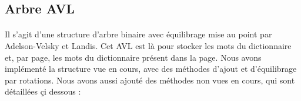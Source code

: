\documentclass[a4paper]{article}
\begin{document}
		\subsection{Arbre AVL}
		
		\paragraph{}{
		Il s'agit d'une structure d'arbre binaire avec équilibrage mise au point par 
		Adelson-Velsky et Landis. Cet AVL est là pour stocker les mots du dictionnaire et, 
		par page, les mots du dictionnaire présent dans la page. Nous avons implémenté la 
		structure vue en cours, avec des méthodes d'ajout et d'équilibrage par rotations. 
		Nous avons aussi ajouté des méthodes non vues en cours, qui sont détaillées çi dessous :
		}
		
\end{document}
